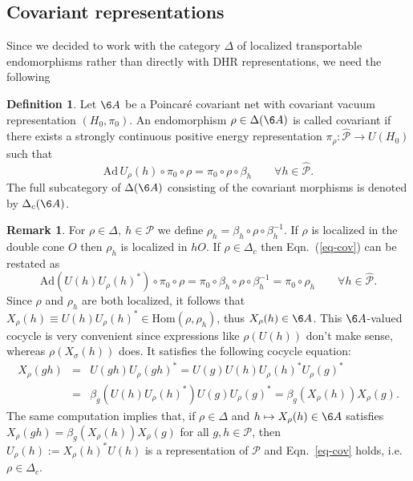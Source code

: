 \documentclass[11pt]{article}
\theoremstyle{definition}
\theoremstyle{definition}
\newtheorem{defn}[thm]{Definition}
\newtheorem{note}[thm]{Remark}
\theoremstyle{remark}
\def\2#1{{\mathcal #1}}
\newcommand{\Hom}{\mathrm{Hom}}
\newcommand{\rarr}{\rightarrow}
\begin{document}
\subsection{Covariant representations} \label{ss-cov}
Since we decided to work with the category $\Delta$ of
localized transportable endomorphisms rather than
directly with DHR representations, we need the
following

\begin{defn} Let $\6A$ be a Poincar\'e covariant net
  with covariant vacuum representation
  $(H_0,\pi_0)$. An endomorphism $\rho\in\Delta(\6A)$
  is called covariant if there exists a strongly
  continuous positive energy representation $\pi_\rho:
  \widehat{\2P}\rarr U(H_0)$ such that
  \begin{equation} \label{eq-cov}
    \mathrm{Ad}\,U_\rho(h)\circ\pi_0\circ\rho=\pi_0\circ\rho\circ\beta_h\quad\quad\forall
    h\in\widehat{\2P}. \end{equation} The full
  subcategory of $\Delta(\6A)$ consisting of the
  covariant morphisms is denoted by $\Delta_c(\6A)$.
\end{defn}

\begin{note} \label{note-cov1} For $\rho\in\Delta,\
  h\in\2P$ we define
  $\rho_h=\beta_h\circ\rho\circ\beta_h^{-1}$. If $\rho$
  is localized in the double cone $O$ then $\rho_h$ is
  localized in $hO$. If $\rho\in\Delta_c$ then Eqn.\
  (\ref{eq-cov}) can be restated as
  \[ \mathrm{Ad}(U(h)U_\rho(h)^*)\circ\pi_0\circ\rho
  =\pi_0\circ\beta_h\circ\rho\circ\beta_h^{-1}
  =\pi_0\circ\rho_h \quad\quad\forall
  h\in\widehat{\2P}. \] Since $\rho$ and $\rho_h$ are
  both localized, it follows that $X_\rho(h)\equiv
  U(h)U_\rho(h)^*\in\Hom(\rho,\rho_h)$, thus
  $X_\rho(h)\in\6A$.  This $\6A$-valued cocycle is very
  convenient since expressions like $\rho(U(h))$ don't
  make sense, whereas $\rho(X_\sigma(h))$ does. It
  satisfies the following cocycle equation:
\begin{eqnarray*} X_\rho(gh) &=& U(gh)U_\rho(gh)^*=U(g)U(h)U_\rho(h)^*U_\rho(g)^* \\
   &=& \beta_g(U(h)U_\rho(h)^*)U(g)U_\rho(g)^* =  \beta_g(X_\rho(h))X_\rho(g). 
\end{eqnarray*}
The same computation implies that, if $\rho\in\Delta$
and $h\mapsto X_\rho(h)\in\6A$ satisfies
$X_\rho(gh)=\beta_g(X_\rho(h))X_\rho(g)$ for all
$g,h\in\2P$, then $U_\rho(h):=X_\rho(h)^*U(h)$ is a
representation of $\2P$ and Eqn.\ \ref{eq-cov} holds,
i.e.\ $\rho\in\Delta_c$.
\end{note}
\end{document}
